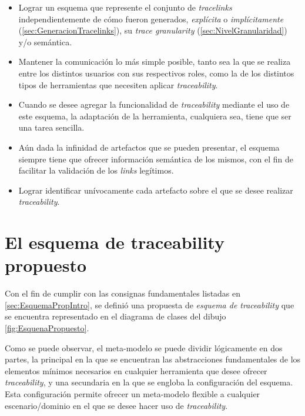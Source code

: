 \documentclass[a4paper,12pt,twoside,spanish,openright]{book}
\begin{document}
\begin{itemize}

\item Lograr un esquema que represente el conjunto de \textit{tracelinks} independientemente de cómo fueron generados, \textit{explícita} o \textit{implícitamente} (\ref{sec:GeneracionTracelinks}), su \textit{trace granularity} (\ref{sec:NivelGranularidad}) y/o semántica.

\item Mantener la comunicación lo más simple posible, tanto sea la que se realiza entre los distintos usuarios con sus respectivos roles, como la de los distintos tipos de herramientas que necesiten aplicar \textit{traceability}.

\item Cuando se desee agregar la funcionalidad de \textit{traceability} mediante el uso de este esquema, la adaptación de la herramienta, cualquiera sea, tiene que ser una tarea sencilla.

\item Aún dada la infinidad de artefactos que se pueden presentar, el esquema siempre tiene que ofrecer información semántica de los mismos, con el fin de facilitar la validación de los \textit{links} legítimos.

\item Lograr identificar unívocamente cada artefacto sobre el que se desee realizar \textit{traceability}.

\end{itemize}

\section{El esquema de traceability propuesto}
\label{sec:EsquemaTraceability}

Con el fin de cumplir con las consignas fundamentales listadas en \ref{sec:EsquemaPropIntro}, se definió una propuesta de \textit{esquema de traceability} que se encuentra representado en el diagrama de clases del dibujo \ref{fig:EsquenaPropuesto}.

Como se puede observar, el meta-modelo se puede dividir lógicamente en dos partes, la principal en la que se encuentran las abstracciones fundamentales de los elementos mínimos necesarios en cualquier herramienta que desee ofrecer \textit{traceability}, y una secundaria en la que se engloba la configuración del esquema. Esta configuración permite ofrecer un meta-modelo flexible a cualquier escenario/dominio en el que se desee hacer uso de \textit{traceability}.
\end{document}
